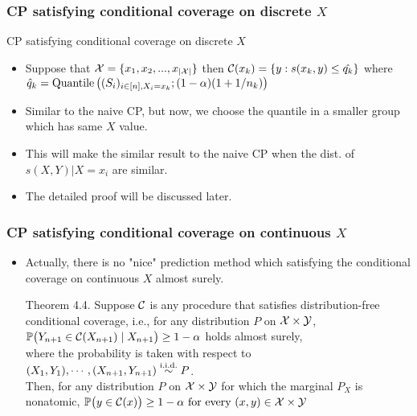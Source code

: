 \documentclass[compress]{beamer}
\begin{document}
\begin{frame}\frametitle{CP satisfying conditional coverage on discrete $X$}
	
	\begin{alertblock}{CP satisfying conditional coverage on discrete $X$}
		\begin{itemize}
		\item Suppose that  $\mathcal{X} = \{x_1, x_2, ..., x_{|\mathcal{X}|}\}$ then 
		 $\mathcal{C}(x_k) = \{y : s(x_k, y)\le \hat{q_k}\}$ where
			$\hat{q}_k = \mathrm{Quantile}\left((S_i)_{i\in [n], X_i = x_k} ; (1-\alpha)(1+1/n_k)\right)$\\
		\item Similar to the naive CP, but now, we choose the quantile in a smaller group which has same $X$ value.
		\end{itemize}
	\end{alertblock}
	\begin{itemize}
		\item This will make the similar result to the naive CP when the dist. of $s(X, Y)|X=x_i$ are similar.
		\item The detailed proof will be discussed later.
	\end{itemize}
\end{frame}

\begin{frame}\frametitle{CP satisfying conditional coverage on continuous $X$}
	\begin{itemize}
		\item Actually, there is no "nice" prediction method which satisfying the conditional coverage on continuous $X$ almost surely.
		\begin{block}{Theorem 4.4.}
			Suppose $\mathcal{C}$ is any procedure  that satisfies distribution-free conditional coverage, i.e., for any distribution $P$ on $\mathcal{X}\times\mathcal{Y}$, 
			$\mathbb{P}\big(Y_{n+1}\in\mathcal{C}(X_{n+1})\mid X_{n+1}\big)\geq 1-\alpha$
			holds almost surely, \\
			where the probability is taken with respect to $(X_1,Y_1),\cdots,(X_{n+1},Y_{n+1})\stackrel{\textnormal{i.i.d.}}{\sim} P$.
			\\Then, for any distribution $P$ on $\mathcal{X}\times\mathcal{Y}$ for which the marginal $P_X$ is nonatomic, 
			$\mathbb{P}\big(y\in \mathcal{C}(x)\big)\geq 1-\alpha\textnormal{ for every $(x,y)\in\mathcal{X}\times\mathcal{Y}$}$
		\end{block}
	\end{itemize}
\end{frame}
\end{document}
